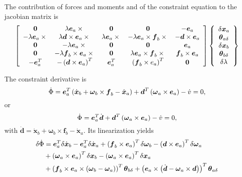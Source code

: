 \documentclass[10pt,dvips,fleqn,subeqn]{report}
\newcommand{\T}[1]{\boldsymbol{#1}}
\begin{document}
The contribution of forces and moments and of the constraint equation 
to the jacobian matrix is
\begin{equation}
	\sqbr{\matr{ccccc}{
		\T{0} & \lambda \T{e}_a \times{} & \T{0} & \T{0} & - \T{e}_a \\
		- \lambda \T{e}_a \times{} & \lambda \T{d}\times\T{e}_a\times{} & 
			\lambda \T{e}_a \times{} & - \lambda \T{e}_a \times \T{f}_b\times{} &
			- \T{d}\times\T{e}_a \\
		\T{0} & - \lambda \T{e}_a \times{} & \T{0} & \T{0} & \T{e}_a \\
		\T{0} & - \lambda \T{f}_b \times \T{e}_a \times{} &
			\T{0} & \lambda \T{e}_a\times\T{f}_b\times{} & \T{f}_b\times\T{e}_a \\
		- \T{e}_a^T & - \plbr{\T{d} \times \T{e}_a}^T &
			\T{e}_a^T & \plbr{\T{f}_b\times{e}_a}^T & \T{0}
	}}\cubr{\cvvect{
		\delta\T{x}_a \\
		\T{\theta}_{a\delta} \\
		\delta\T{x}_b \\
		\T{\theta}_{b\delta} \\
		\delta\lambda
	}}
\end{equation}

The constraint derivative is
\begin{equation}
	\dot{\Phi} = \T{e}_a^T\plbr{
		\dot{\T{x}}_b
		+ \T{\omega}_b \times \T{f}_b
		- \dot{\T{x}}_a
	} + \T{d}^T \plbr{\T{\omega}_a \times \T{e}_a} - \dot{v} = 0 ,
\end{equation}
or
\begin{equation}
	\dot{\Phi} = \T{e}_a^T \dot{\T{d}}
	+ \T{d}^T \plbr{\T{\omega}_a \times \T{e}_a} - \dot{v} = 0 ,
\end{equation}
with $\dot{\T{d}}=\dot{\T{x}}_b+\T{\omega}_b\times\T{f}_b-\dot{\T{x}}_a$.
Its linearization yields
\begin{align}
	\delta\dot{\Phi} &= \T{e}_a^T \delta\dot{\T{x}}_b
	- \T{e}_a^T \delta\dot{\T{x}}_a
	+ \plbr{\T{f}_b \times \T{e}_a}^T \delta\T{\omega}_b
	- \plbr{\T{d} \times \T{e}_a}^T \delta\T{\omega}_a \nonumber \\
	& + \plbr{\T{\omega}_a \times \T{e}_a}^T \delta\T{x}_b
	- \plbr{\T{\omega}_a \times \T{e}_a}^T \delta\T{x}_a \nonumber \\
	& + \plbr{\T{f}_b \times \T{e}_a \times \plbr{\T{\omega}_b - \T{\omega}_a}}^T \T{\theta}_{b\delta}
	+ \plbr{\T{e}_a \times \plbr{\dot{\T{d}} - \T{\omega}_a \times \T{d}}}^T \T{\theta}_{a\delta}
\end{align}
\end{document}
